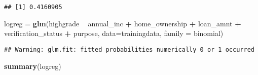\documentclass[
]{article}
\newenvironment{Shaded}{\begin{snugshade}}{\end{snugshade}}
\newcommand{\DataTypeTok}[1]{\textcolor[rgb]{0.13,0.29,0.53}{#1}}
\newcommand{\DecValTok}[1]{\textcolor[rgb]{0.00,0.00,0.81}{#1}}
\newcommand{\KeywordTok}[1]{\textcolor[rgb]{0.13,0.29,0.53}{\textbf{#1}}}
\newcommand{\NormalTok}[1]{#1}
\newcommand{\OperatorTok}[1]{\textcolor[rgb]{0.81,0.36,0.00}{\textbf{#1}}}
\newcommand{\StringTok}[1]{\textcolor[rgb]{0.31,0.60,0.02}{#1}}
\begin{document}
\begin{Shaded}
\end{Shaded}

\begin{verbatim}
## [1] 0.4160905
\end{verbatim}

\begin{Shaded}
\begin{Highlighting}[]
\NormalTok{logreg =}\StringTok{ }\KeywordTok{glm}\NormalTok{(highgrade }\OperatorTok{~}\StringTok{ }\NormalTok{annual_inc }\OperatorTok{+}\StringTok{ }\NormalTok{home_ownership }\OperatorTok{+}\StringTok{ }\NormalTok{loan_amnt }\OperatorTok{+}\StringTok{ }\NormalTok{verification_status}
\OperatorTok{+}\StringTok{ }\NormalTok{purpose, }\DataTypeTok{data=}\NormalTok{trainingdata, }\DataTypeTok{family =}\NormalTok{ binomial)}
\end{Highlighting}
\end{Shaded}

\begin{verbatim}
## Warning: glm.fit: fitted probabilities numerically 0 or 1 occurred
\end{verbatim}

\begin{Shaded}
\begin{Highlighting}[]
\KeywordTok{summary}\NormalTok{(logreg)}
\end{Highlighting}
\end{Shaded}
\end{document}
